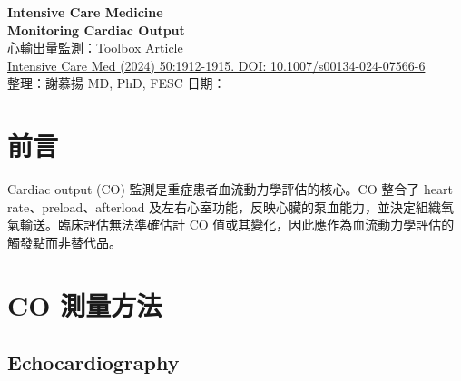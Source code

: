 \documentclass[11pt,a4paper]{article}
\begin{document}
\begin{center}
{\LARGE\bfseries\textcolor{emergency_red}{Intensive Care Medicine}}\\[0.5cm]
{\Large\textbf{Monitoring Cardiac Output}}\\[0.3cm]
{\large 心輸出量監測：Toolbox Article}\\[0.5cm]
{\normalsize \href{https://doi.org/10.1007/s00134-024-07566-6}{Intensive Care Med (2024) 50:1912-1915. DOI: 10.1007/s00134-024-07566-6}}\\[0.3cm]
{\normalsize 整理：謝慕揚 MD, PhD, FESC \quad 日期：\mydate}
\end{center}

\vspace{0.5cm}

\section{前言}

Cardiac output (CO) 監測是重症患者血流動力學評估的核心。CO 整合了 heart rate、preload、afterload 及左右心室功能，反映心臟的泵血能力，並決定組織氧氣輸送。臨床評估無法準確估計 CO 值或其變化，因此應作為血流動力學評估的觸發點而非替代品。


\section{CO 測量方法}

\subsection{Echocardiography}
\end{document}
